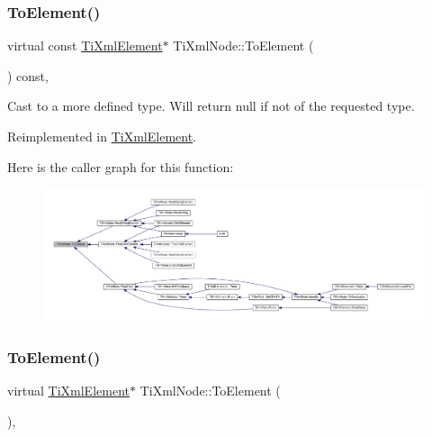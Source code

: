 \mbox{\label{class_ti_xml_node_a4080428f2cac46e92ef4d284202fad0b}} 
\subsubsection{\texorpdfstring{To\+Element()}{ToElement()}\hspace{0.1cm}{\footnotesize\ttfamily [1/2]}}
{\footnotesize\ttfamily virtual const \hyperlink{class_ti_xml_element}{Ti\+Xml\+Element}$\ast$ Ti\+Xml\+Node\+::\+To\+Element (\begin{DoxyParamCaption}{ }\end{DoxyParamCaption}) const\hspace{0.3cm}{\ttfamily [inline]}, {\ttfamily [virtual]}}



Cast to a more defined type. Will return null if not of the requested type. 



Reimplemented in \hyperlink{class_ti_xml_element_a940fc8aa953e0ef0de6e110b7d98b8ee}{Ti\+Xml\+Element}.

Here is the caller graph for this function\+:\nopagebreak
\begin{figure}[H]
\begin{center}
\leavevmode
\includegraphics[width=350pt]{class_ti_xml_node_a4080428f2cac46e92ef4d284202fad0b_icgraph}
\end{center}
\end{figure}
\mbox{\label{class_ti_xml_node_aa65d000223187d22a4dcebd7479e9ebc}} 
\subsubsection{\texorpdfstring{To\+Element()}{ToElement()}\hspace{0.1cm}{\footnotesize\ttfamily [2/2]}}
{\footnotesize\ttfamily virtual \hyperlink{class_ti_xml_element}{Ti\+Xml\+Element}$\ast$ Ti\+Xml\+Node\+::\+To\+Element (\begin{DoxyParamCaption}{ }\end{DoxyParamCaption})\hspace{0.3cm}{\ttfamily [inline]}, {\ttfamily [virtual]}}



